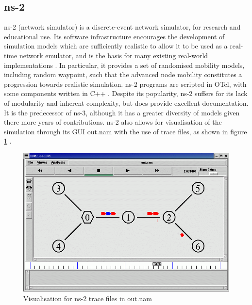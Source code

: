 \subsection{ns-2}
ns-2 (network simulator) is a discrete-event network simulator, for research and educational use. Its software infrastructure encourages the development of simulation models which are sufficiently realistic to allow it to be used as a real-time network emulator, and is the basis for many existing real-world implementations \cite{tommasopecorella2016}. In particular, it provides a set of randomised mobility models, including random waypoint, such that the advanced node mobility constitutes a progression towards realistic simulation. ns-2 programs are scripted in OTcl, with some components written in C++ . Despite its popularity, ns-2 suffers for its lack of modularity and inherent complexity, but does provide excellent documentation. It is the predecessor of ns-3, although it has a greater diversity of models given there more years of contributions. ns-2 also allows for visualisation of the simulation through its GUI out.nam with the use of trace files, as shown in figure \ref{outnam} \cite{luchogie2006}.

\begin{figure}
\centering	
\includegraphics[scale=0.4]{img/outnam}	
\caption{ Visualisation for ns-2 trace files in out.nam}
\label{outnam}
\end{figure}

